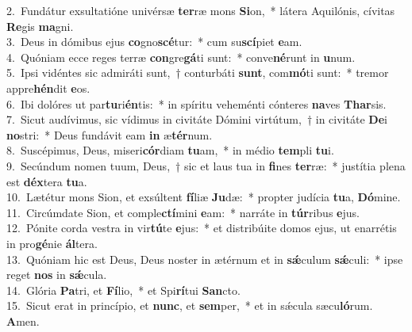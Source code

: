 {2.~}Fundátur exsultatióne univérsæ \textbf{ter}ræ mons \textbf{Si}on,~* látera Aquilónis, cívitas \textbf{Re}gis \textbf{ma}gni.\\
{3.~}Deus in dómibus ejus \textbf{co}gno\textbf{scé}tur:~* cum su\textbf{scí}piet \textbf{e}am.\\
{4.~}Quóniam ecce reges terræ \textbf{con}gre\textbf{gá}ti sunt:~* conve\textbf{né}runt in \textbf{u}num.\\
{5.~}Ipsi vidéntes sic admiráti sunt,~† conturbáti \textbf{sunt}, com\textbf{mó}ti sunt:~* tremor appre\textbf{hén}dit \textbf{e}os.\\
{6.~}Ibi dolóres ut par\textbf{tu}ri\textbf{én}tis:~* in spíritu veheménti cónteres \textbf{na}ves \textbf{Thar}sis.\\
{7.~}Sicut audívimus, sic vídimus in civitáte Dómini virtútum,~† in civitáte \textbf{De}i \textbf{no}stri:~* Deus fundávit eam \textbf{in} æ\textbf{tér}num.\\
{8.~}Suscépimus, Deus, miseri\textbf{cór}diam \textbf{tu}am,~* in médio \textbf{tem}pli \textbf{tu}i.\\
{9.~}Secúndum nomen tuum, Deus,~† sic et laus tua in \textbf{fi}nes \textbf{ter}ræ:~* justítia plena est \textbf{déx}tera \textbf{tu}a.\\
{10.~}Lætétur mons Sion, et exsúltent \textbf{fí}liæ \textbf{Ju}dæ:~* propter judícia \textbf{tu}a, \textbf{Dó}mine.\\
{11.~}Circúmdate Sion, et comple\textbf{ctí}mini \textbf{e}am:~* narráte in \textbf{túr}ribus \textbf{e}jus.\\
{12.~}Pónite corda vestra in vir\textbf{tú}te \textbf{e}jus:~* et distribúite domos ejus, ut enarrétis in pro\textbf{gé}nie \textbf{ál}tera.\\
{13.~}Quóniam hic est Deus, Deus noster in ætérnum et in \textbf{sǽ}culum \textbf{sǽ}culi:~* ipse reget \textbf{nos} in \textbf{sǽ}cula.\\
{14.~}Glória \textbf{Pa}tri, et \textbf{Fí}lio,~* et Spi\textbf{rí}tui \textbf{San}cto.\\
{15.~}Sicut erat in princípio, et \textbf{nunc}, et \textbf{sem}per,~* et in sǽcula sæcu\textbf{ló}rum. \textbf{A}men.\\
